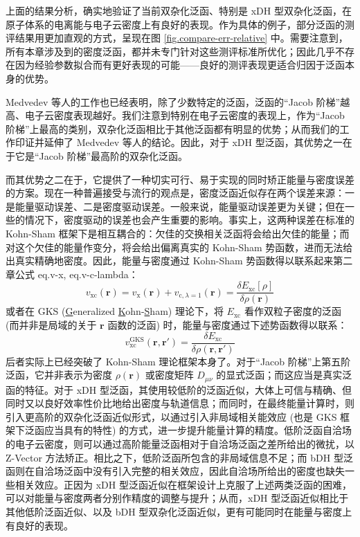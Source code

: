 上面的结果分析，确实地验证了当前双杂化泛函、特别是 xDH 型双杂化泛函，在原子体系的电离能与电子云密度上有良好的表现。作为具体的例子，部分泛函的测评结果用更加直观的方式，呈现在图 \ref{fig.compare-err-relative} 中。需要注意到，所有本章涉及到的密度泛函，都并未专门针对这些测评标准所优化；因此几乎不存在因为经验参数拟合而有更好表现的可能——良好的测评表现更适合归因于泛函本身的优势。

Medvedev 等人的工作也已经表明，除了少数特定的泛函，泛函的“Jacob 阶梯”越高、电子云密度表现越好。我们注意到特别在电子云密度的表现上，作为“Jacob 阶梯”上最高的类别，双杂化泛函相比于其他泛函都有明显的优势；从而我们的工作印证并延伸了 Medvedev 等人的结论。因此，对于 xDH 型泛函，其优势之一在于它是“Jacob 阶梯”最高阶的双杂化泛函。

而其优势之二在于，它提供了一种切实可行、易于实现的同时矫正能量与密度误差的方案。现在一种普遍接受与流行的观点是，密度泛函近似存在两个误差来源：一是能量驱动误差、二是密度驱动误差。一般来说，能量驱动误差更为关键\cite{Cohen-Yang.CR.2012}；但在一些的情况下，密度驱动的误差也会产生重要的影响\cite{Kim-Burke.JCP.2014}。事实上，这两种误差在标准的 Kohn-Sham 框架下是相互耦合的：欠佳的交换相关泛函将会给出欠佳的能量；而对这个欠佳的能量作变分，将会给出偏离真实的 Kohn-Sham 势函数，进而无法给出真实精确地密度。因此，能量与密度通过 Kohn-Sham 势函数得以联系起来\alert{第二章公式 eq.v-x, eq.v-c-lambda}：
\begin{equation}
    v_\mathrm{xc} (\bm{r}) = v_\mathrm{x} (\bm{r}) + v_{\mathrm{c}, \lambda=1} (\bm{r}) = \frac{\delta E_\mathrm{xc} [\rho]}{\delta \rho(\bm{r})}
\end{equation}
或者在 GKS (\underline{G}eneralized \underline{K}ohn-\underline{S}ham) 理论下，将 $E_\mathrm{xc}$ 看作双粒子密度的泛函 (而并非是局域的关于 $\bm{r}$ 函数的泛函) 时，能量与密度通过下述势函数得以联系：
\begin{equation}
    v_\mathrm{xc}^\mathrm{GKS} (\bm{r}, \bm{r}') = \frac{\delta E_\mathrm{xc}}{\delta \rho(\bm{r}, \bm{r}')}
\end{equation}
后者实际上已经突破了 Kohn-Sham 理论框架本身了\cite{Su-Xu.WCMS.2016, Su-Xu.IJQC.2015, Su-Xu.MP.2016}。对于“Jacob 阶梯”上第五阶泛函，它并非表示为密度 $\rho(\bm{r})$ 或密度矩阵 $D_{\mu \nu}$ 的显式泛函；而这应当是真实泛函的特征\cite{Kohn-Kohn.PRB.1986, Yang-Mori-Sanchez.JCP.2012}。对于 xDH 型泛函，其使用较低阶的泛函近似，大体上可信与精确、但同时又以良好效率性价比地给出密度与轨道信息；而同时，在最终能量计算时，则引入更高阶的双杂化泛函近似形式，以通过引入非局域相关能效应 (也是 GKS 框架下泛函应当具有的特性) 的方式，进一步提升能量计算的精度。低阶泛函自洽场的电子云密度，则可以通过高阶能量泛函相对于自洽场泛函之差所给出的微扰，以 Z-Vector 方法矫正\cite{Handy-Schaefer.JCP.1984, Su-Xu.JCC.2013}。相比之下，低阶泛函所包含的非局域信息不足；而 bDH 型泛函则在自洽场泛函中没有引入完整的相关效应，因此自洽场所给出的密度也缺失一些相关效应。正因为 xDH 型泛函近似在框架设计上克服了上述两类泛函的困难，可以对能量与密度两者分别作精度的调整与提升；从而，xDH 型泛函近似相比于其他低阶泛函近似、以及 bDH 型双杂化泛函近似，更有可能同时在能量与密度上有良好的表现。

